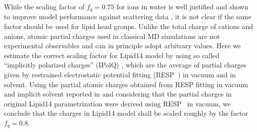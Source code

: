 \documentclass[aip,jcp,twocolumn]{revtex4}
\begin{document}
While the scaling factor of $f_q = 0.75$ for ions in water is well justified and shown
to improve model performance against scattering data \cite{kohagen14,kohagen16, Pluharova2014},
it is not clear if the same factor should be used for lipid head groups. 
Unlike the total charge of cations and anions, atomic partial charges used in
classical MD simulations are not experimental observables and 
can in principle adopt arbitrary values. 
Here we estimate the correct scaling factor for Lipid14 model by using
so called ``implicitly polarized charges'' (IPolQ) \cite{ipolq2013},
which are the average of partial charges given by 
restrained electrostatic potential fitting (RESP~\cite{RESP_paper}) 
in vacuum and in solvent.
Using the partial atomic charges obtained from RESP fitting in vacuum and implicit solvent reported in \cite{maciejewski14} and
considering that the partial charges in original Lipid14 parametrization were derived using RESP~\cite{RESP_paper} in vacuum,
we conclude that the charges in Lipid14 model shall be scaled roughly by the factor $f_q=0.8$. 
\end{document}

